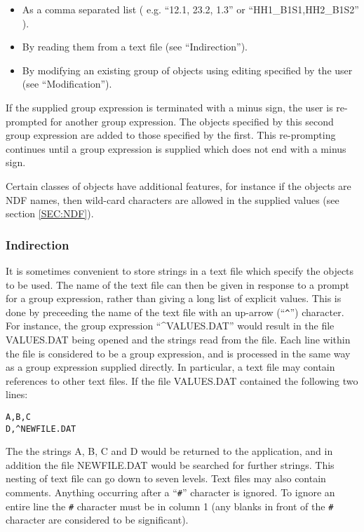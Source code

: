 \begin{itemize}
\item As a comma separated list ( e.g. ``12.1, 23.2, 1.3''
     or ``HH1\_B1S1,HH2\_B1S2'' ).

\item By reading them from a text file (see ``Indirection'').

\item By modifying an existing group of objects using editing
     specified by the user (see ``Modification'').
\end{itemize}
If the supplied group expression is terminated with a minus
sign, the user is re-prompted for another group expression. The
objects specified by this second group expression are added to
those specified by the first. This re-prompting continues until
a group expression is supplied which does not end with a minus
sign.

Certain classes of objects have additional features, for
instance if the objects are {\small NDF} names, then wild-card characters
are allowed in the supplied values (see section \ref{SEC:NDF}).

\subsubsection{Indirection}
It is sometimes convenient to store strings in a text file which specify the
objects to be used. The name of the text file can
then be given in response to a prompt for a group expression,
rather than giving a long list of explicit values. This is done
by preceeding the name of the text file with an up-arrow (``\verb+^+'')
character. For instance, the group expression ``\^{}{\small VALUES.DAT}''
would result in the file {\small VALUES.DAT} being opened and the strings
read from the file. Each line within the file is considered to
be a group expression, and is processed in the same way as a
group expression supplied directly. In particular, a text file
may contain references to other text files. If the file
{\small VALUES.DAT} contained the following two lines:

\small
\begin{verbatim}
A,B,C
D,^NEWFILE.DAT
\end{verbatim}
\normalsize

The the strings A, B, C and D would be returned to the
application, and in addition the file {\small NEWFILE.DAT} would be
searched for further strings. This nesting of text file can go
down to seven levels. Text files may also contain comments.
Anything occurring after a ``\verb+#+'' character is ignored. To ignore
an entire line the \verb+#+ character must be in column 1 (any blanks in
front of the \verb+#+ character are considered to be significant).

